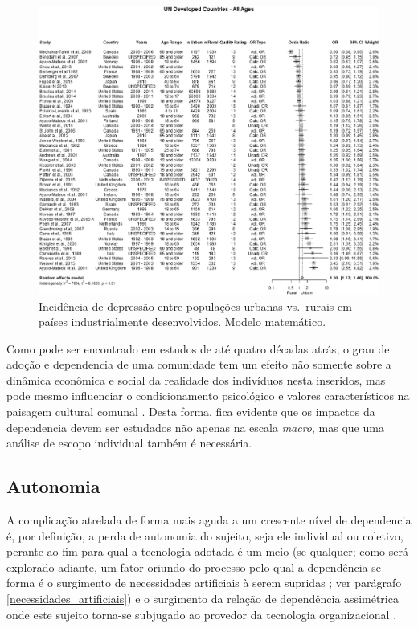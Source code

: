 \begin{figure}[h]
    \centering
    \includegraphics[width=15cm]{Content/Images/depression_rate.jpg}
    \caption{Incidência de depressão entre populações urbanas vs.\ rurais em países industrialmente desenvolvidos. Modelo
  matemático. \cite{XU2023299}}
\end{figure}

Como pode ser encontrado em estudos de até quatro décadas atrás, o grau de adoção e \gls{dependencia} de uma comunidade tem
um efeito não somente sobre a dinâmica econômica e social da realidade dos indivíduos nesta inseridos, mas pode mesmo
influenciar o condicionamento psicológico e valores característicos na paisagem cultural comunal \cite[27-30]{secretariat1977}.
Desta forma, fica evidente que os impactos da \gls{dependencia} devem ser estudados não apenas na escala \textit{macro},
mas que uma análise de escopo individual também é necessária.

\subsection{Autonomia}

A complicação atrelada de forma mais aguda a um crescente nível de \gls{dependencia} é, por definição, a perda de autonomia do
sujeito, seja ele individual ou coletivo, perante ao fim para qual a tecnologia adotada é um meio (se qualquer; como
será explorado adiante, um fator oriundo do processo pelo qual a dependência se forma é o surgimento de necessidades
artificiais à serem supridas \cite[\S59-65]{kaczynski1995}; ver parágrafo \ref{necessidades_artificiais}) e o surgimento
da relação de dependência assimétrica onde este sujeito torna-se subjugado ao provedor da tecnologia organizacional
\cite[27-30]{secretariat1977}.

